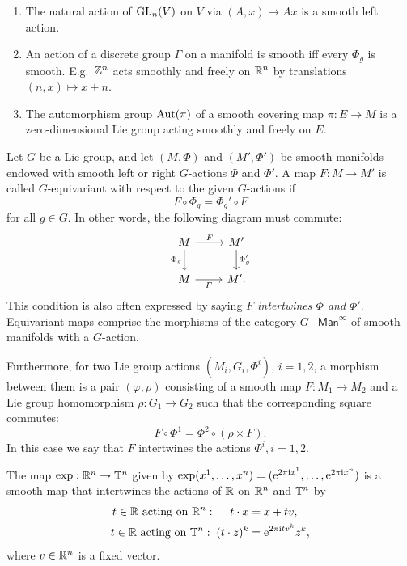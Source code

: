 \begin{example}
    \begin{enumerate}[label=(\alph*)]
        \item The natural action of $\operatorname{GL}_n(V)$ on $V$ via $(A,x)\mapsto Ax$ is a smooth left action.
        \item An action of a discrete group $\Gamma$ on a manifold is smooth iff every $\Phi_g$ is smooth. E.g.~$\mathbb{Z}^n$ acts smoothly and freely on $\mathbb{R}^n$ by translations $(n,x)\mapsto x+n$.
        \item The automorphism group $\operatorname{Aut}(\pi)$ of a smooth covering map $\pi:E\to M$ is a zero-dimensional Lie group acting smoothly and freely on $E$.
    \end{enumerate}
\end{example}

\begin{defn}
    Let $G$ be a Lie group, and let $(M,\Phi)$ and $(M',\Phi')$ be smooth manifolds endowed with smooth left or right $G$-actions $\Phi$ and $\Phi'$. A map $F:M\to M'$ is called $G$-equivariant with respect to the given $G$-actions if
    \[F\circ \Phi_g=\Phi_g' \circ F\]
    for all $g\in G$.
    In other words, the following diagram must commute:
    \[
    \begin{tikzcd}[every matrix/.append style={name=m}]
       M \arrow[r,"F"]\arrow[d,"\Phi_g",swap] & M'\arrow[d,"\Phi_g'"]\\
       M \arrow[r,"F", swap] & M'.
    \end{tikzcd}
    \]
    This condition is also often expressed by saying \emph{$F$ intertwines $\Phi$ and $\Phi'$}. Equivariant maps comprise the morphisms of the category $G\mathsf{-Man}^\infty$ of smooth manifolds with a $G$-action.

    Furthermore, for two Lie group actions $(M_i,G_i,\Phi^i)$, $i=1,2$, a morphism between them is a pair $(\varphi,\rho)$ consisting of a smooth map $F:M_1\to M_2$ and a Lie group homomorphism $\rho:G_1\to G_2$ such that the corresponding square commutes:
    \[F\circ \Phi^1=\Phi^2\circ \left(\rho\times F \right).\]
    In this case we say that $F$ intertwines the actions $\Phi^i,i=1,2$.
\end{defn}

\begin{example}
    The map $\exp:\mathbb{R}^n\to \mathbb{T}^n$ given by $\exp(x^1,\ldots,x^n)=(\mathrm{e}^{2\pi\mathrm{i} x^1},\ldots,\mathrm{e}^{2\pi\mathrm{i} x^n})$ is a smooth map that intertwines the actions of $\mathbb{R}$ on $\mathbb{R}^n$ and $\mathbb{T}^n$ by
    \begin{align}
        t\in\mathbb{R}\text{ acting on }\mathbb{R}^n:\;\quad t\cdot x&=x+tv,\\
        t\in\mathbb{R}\text{ acting on }\mathbb{T}^n:\; (t\cdot z)^k&=\mathrm{e}^{2\pi\mathrm{i} tv^k}z^k,
    \end{align}
    where $v\in\mathbb{R}^n$ is a fixed vector.
\end{example}

